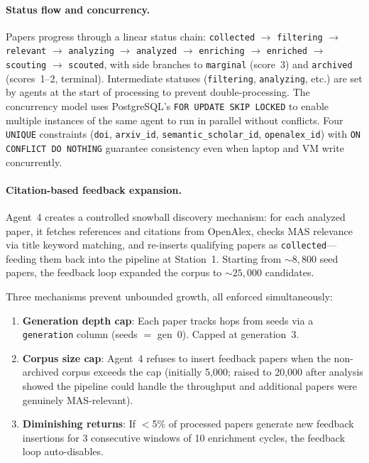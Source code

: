 \documentclass{article}
\begin{document}
\paragraph{Status flow and concurrency.}
Papers progress through a linear status chain:
\texttt{collected} $\to$ \texttt{filtering} $\to$ \texttt{relevant} $\to$
\texttt{analyzing} $\to$ \texttt{analyzed} $\to$ \texttt{enriching} $\to$
\texttt{enriched} $\to$ \texttt{scouting} $\to$ \texttt{scouted},
with side branches to \texttt{marginal} (score~3) and \texttt{archived}
(scores~1--2, terminal). Intermediate statuses (\texttt{filtering},
\texttt{analyzing}, etc.) are set by agents at the start of processing to prevent
double-processing. The concurrency model uses PostgreSQL's \texttt{FOR UPDATE SKIP
LOCKED} to enable multiple instances of the same agent to run in parallel without
conflicts. Four \texttt{UNIQUE} constraints (\texttt{doi}, \texttt{arxiv\_id},
\texttt{semantic\_scholar\_id}, \texttt{openalex\_id}) with \texttt{ON CONFLICT DO
NOTHING} guarantee consistency even when laptop and VM write concurrently.

\paragraph{Citation-based feedback expansion.}
Agent~4 creates a controlled snowball discovery mechanism: for each analyzed paper,
it fetches references and citations from OpenAlex, checks MAS relevance via title
keyword matching, and re-inserts qualifying papers as \texttt{collected}---feeding
them back into the pipeline at Station~1. Starting from ${\sim}8{,}800$ seed papers,
the feedback loop expanded the corpus to ${\sim}25{,}000$ candidates.

Three mechanisms prevent unbounded growth, all enforced simultaneously:
\begin{enumerate}[nosep]
  \item \textbf{Generation depth cap}: Each paper tracks hops from seeds via a
    \texttt{generation} column (seeds $=$ gen~0). Capped at generation~3.
  \item \textbf{Corpus size cap}: Agent~4 refuses to insert feedback papers when the
    non-archived corpus exceeds the cap (initially 5,000; raised to 20,000 after
    analysis showed the pipeline could handle the throughput and additional papers
    were genuinely MAS-relevant).
  \item \textbf{Diminishing returns}: If $<$5\% of processed papers generate new
    feedback insertions for 3 consecutive windows of 10 enrichment cycles, the
    feedback loop auto-disables.
\end{enumerate}
\end{document}
